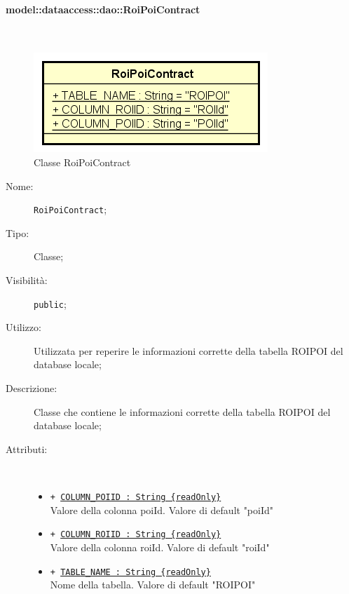 \documentclass[../DefinizioneDiProdotto.tex]{subfiles}
\begin{document}
\paragraph{model::dataaccess::dao::RoiPoiContract}
\
\begin{figure}[H]
	\centering
	\includegraphics[width=\maxwidth]{img/RoiPoiContract.png}
	\caption{Classe RoiPoiContract}\label{fig:model::dataaccess::dao::RoiPoiContract} 
\end{figure}
\begin{description}
	\item[Nome:] \texttt{RoiPoiContract};
	\item[Tipo:] Classe;
	\item[Visibilità:] \texttt{public};
	\item[Utilizzo:] Utilizzata per reperire le informazioni corrette della tabella ROIPOI del database locale;
	\item[Descrizione:] Classe che contiene le informazioni corrette della tabella ROIPOI del database locale;
	\item[Attributi:] \
	\begin{itemize}
		\item \texttt{+ \underline{COLUMN\_POIID : String \{readOnly\}}}\\
		Valore della colonna poiId. Valore di default "poiId"
		
		\item \texttt{+ \underline{COLUMN\_ROIID : String \{readOnly\}}}\\
		Valore della colonna roiId. Valore di default "roiId"
		
		\item \texttt{+ \underline{TABLE\_NAME : String \{readOnly\}}}\\
		Nome della tabella. Valore di default "ROIPOI"
		
	\end{itemize}
\end{description}
\end{document}

